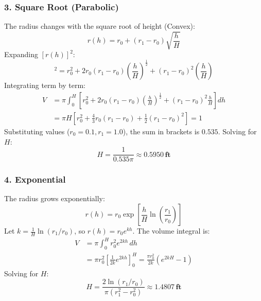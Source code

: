 \documentclass[a4paper, 12pt]{article}
\begin{document}
\subsubsection*{3. Square Root (Parabolic)}
The radius changes with the square root of height (Convex):
\begin{equation}
    r(h) = r_0 + (r_1 - r_0)\sqrt{\frac{h}{H}}
\end{equation}
Expanding $[r(h)]^2$:
\begin{equation}
    [r(h)]^2 = r_0^2 + 2r_0(r_1-r_0)\left(\frac{h}{H}\right)^{\frac{1}{2}} + (r_1-r_0)^2\left(\frac{h}{H}\right)
\end{equation}
Integrating term by term:
\begin{align}
    V &= \pi \int_0^H \left[ r_0^2 + 2r_0(r_1-r_0)\left(\frac{h}{H}\right)^{\frac{1}{2}} + (r_1-r_0)^2\frac{h}{H} \right] dh \nonumber \\
      &= \pi H \left[ r_0^2 + \frac{4}{3}r_0(r_1-r_0) + \frac{1}{2}(r_1-r_0)^2 \right] = 1
\end{align}
Substituting values ($r_0=0.1, r_1=1.0$), the sum in brackets is $0.535$. Solving for $H$:
\begin{equation}
    H = \frac{1}{0.535 \pi} \approx \mathbf{0.5950 \, \text{ft}}
\end{equation}

\subsubsection*{4. Exponential}
The radius grows exponentially:
\begin{equation}
    r(h) = r_0 \exp\left[\frac{h}{H} \ln\left(\frac{r_1}{r_0}\right)\right]
\end{equation}
Let $k = \frac{1}{H}\ln(r_1/r_0)$, so $r(h) = r_0 e^{kh}$. The volume integral is:
\begin{align}
    V &= \pi \int_0^H r_0^2 e^{2kh} \, dh \nonumber \\
      &= \pi r_0^2 \left[ \frac{1}{2k} e^{2kh} \right]_0^H = \frac{\pi r_0^2}{2k} (e^{2kH} - 1)
\end{align}
Solving for $H$:
\begin{equation}
    H = \frac{2 \ln(r_1/r_0)}{\pi (r_1^2 - r_0^2)} \approx \mathbf{1.4807 \, \text{ft}}
\end{equation}

\end{document}
